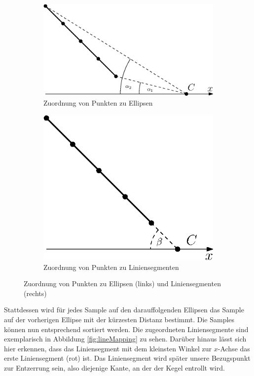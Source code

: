 \begin{figure}[!htb]
	\centering
	\begin{subfigure}{.6\textwidth}
		\centering
		\includegraphics[width=.9\textwidth]{images/sampleMappingProblem.eps}
		\caption{Zuordnung von Punkten zu Ellipsen}
		\label{fig:sampleMappingProblem1}
	\end{subfigure}%
	\begin{subfigure}{.4\textwidth}
		\centering
		\includegraphics[width=.9\textwidth]{images/sampleMappingProblem2.eps}
		\caption{Zuordnung von Punkten zu Liniensegmenten}
		\label{fig:sampleMappingProblem2}
	\end{subfigure}
	\caption{Zuordnung von Punkten zu Ellipsen (links) und Liniensegmenten (rechts)}
	\label{fig:sampleMappingProblem}
\end{figure}

Stattdessen wird für jedes Sample auf den darauffolgenden Ellipsen das Sample auf der vorherigen Ellipse mit der kürzesten Distanz bestimmt.
Die Samples können nun entsprechend sortiert werden. Die zugeordneten Liniensegmente sind exemplarisch in Abbildung \ref{fig:lineMapping} zu sehen. Darüber hinaus lässt sich hier erkennen, dass das Liniensegment mit dem kleinsten Winkel zur $x$-Achse das erste Liniensegment (rot) ist. Das Liniensegment wird später unsere Bezugspunkt zur Entzerrung sein, also diejenige Kante, an der der Kegel entrollt wird.


